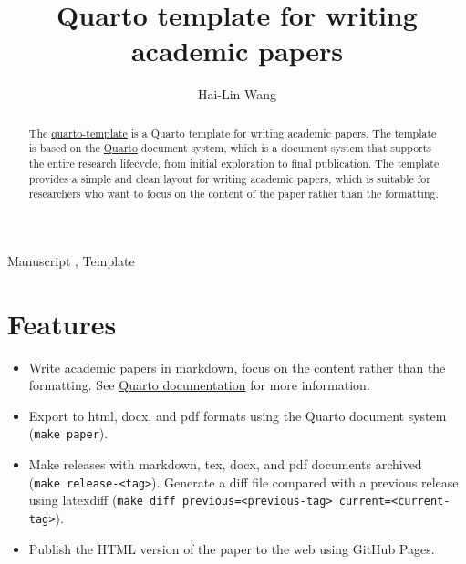 \documentclass[
  authoryear,
  review,
  3p,
  onecolumn]{elsarticle}
\providecommand{\tightlist}{%
  \setlength{\itemsep}{0pt}\setlength{\parskip}{0pt}}\usepackage{longtable,booktabs,array}
\begin{document}
\begin{frontmatter}
\title{Quarto template for writing academic papers}
\author[1,2]{Hai-Lin Wang%
%
}



        
\begin{abstract}
The \href{https://github.com/haiiliin/quarto-template}{quarto-template}
is a Quarto template for writing academic papers. The template is based
on the \href{https://quarto.org}{Quarto} document system, which is a
document system that supports the entire research lifecycle, from
initial exploration to final publication. The template provides a simple
and clean layout for writing academic papers, which is suitable for
researchers who want to focus on the content of the paper rather than
the formatting.
\end{abstract}





\begin{keyword}
    Manuscript \sep 
    Template
\end{keyword}
\end{frontmatter}
    

\section{Features}\label{features}

\begin{itemize}
\tightlist
\item
  Write academic papers in markdown, focus on the content rather than
  the formatting. See \href{https://quarto.org/docs/guide/}{Quarto
  documentation} for more information.
\item
  Export to html, docx, and pdf formats using the Quarto document system
  (\texttt{make\ paper}).
\item
  Make releases with markdown, tex, docx, and pdf documents archived
  (\texttt{make\ release-\textless{}tag\textgreater{}}). Generate a diff
  file compared with a previous release using latexdiff
  (\texttt{make\ diff\ previous=\textless{}previous-tag\textgreater{}\ current=\textless{}current-tag\textgreater{}}).
\item
  Publish the HTML version of the paper to the web using GitHub Pages.
\end{itemize}
\end{document}
